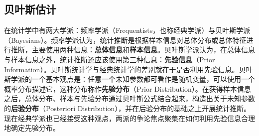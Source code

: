 \subsection{贝叶斯估计}
在统计学中有两大学派：频率学派（Frequentists，也称经典学派）与贝叶斯学派（Bayesians）。频率学派认为，统计推断是根据样本信息对总体分布或总体特征进行推断，主要使用两种信息：\textbf{总体信息}和\textbf{样本信息}。贝叶斯学派认为，在总体信息与样本信息之外，统计推断还应该使用第三种信息：\textbf{先验信息}（Prior Information）。贝叶斯统计学与经典统计学的差别就在于是否利用先验信息。贝叶斯学派的一个基本观点是：任意一个未知参数都可看作是随机变量，可以使用一个概率分布描述它，这种分布称作\textbf{先验分布}（Prior Distribution）。在获得样本信息之后，总体分布、样本与先验分布通过贝叶斯公式结合起来，构造出关于未知参数的\textbf{后验分布}（Posteriori Distribution），并在后验分布的基础之上开展统计推断。现在经典学派也已经接受这种观点\cite{Lehmann2001Theory}，两派的争论焦点聚集在如何利用先验信息合理地确定先验分布。

